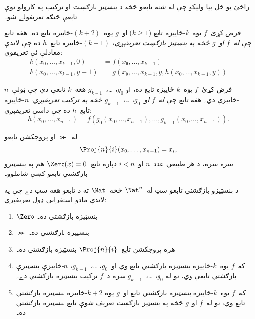 \documentclass[../../../include/open-logic-section]{subfiles}
\begin{document}

راځئ يو ځل بيا وليکو چې له شته تابعو څخه د بنسټيز بازګښت او ترکيب
په کارولو نوې تابعې څنګه تعريفولے شو۔

\begin{defn}
   فرض کړئ~$f$ يوه~$k$-ځاييزه
  تابع ($k\ge 1$) او~$g$ يوه~$(k+2)$-ځاييزه تابع ده۔ هغه تابع چې
  \emph{له~$f$ او~$g$ څخه په بنسټيز بازګښت تعريفېږي}،
  $(k+1)$-ځاييزه تابع~$h$ ده چې لاندې معادلې ئې تعريفوي:
  \begin{align*}
    h(x_0,\dots,x_{k-1},0) & =  f(x_0,\dots,x_{k-1}) \\
    h(x_0,\dots,x_{k-1},y+1) & = g(x_0,\dots,x_{k-1}, y, h(x_0,\dots,x_{k-1}, y))
  \end{align*}
\end{defn}

\begin{defn}
   فرض کړئ~$f$ يوه~$k$-ځاييزه تابع ده، او
  $g_0$، \dots،~$g_{k-1}$ هغه~$k$ تابعې دي چې ټولې~$n$-ځاييزې
  دي۔ هغه تابع چې \emph{له~$f$ او~$g_0$، \dots،~$g_{k-1}$ څخه په
    ترکيب تعريفېږي}، $n$-ځاييزه تابع~$h$ ده چې داسې تعريفېږي:
  \[
  h(x_0, \dots, x_{n-1}) =
  f(g_0(x_0, \dots, x_{n-1}), \dots, g_{k-1}(x_0, \dots, x_{n-1})).
  \]
\end{defn}

له~$\Succ$ او پروجکشن تابعو
\[
\Proj{n}{i}(x_0,\dots,x_{n-1}) = x_i,
\]
سره سره، د هر طبيعي عدد~$n$ او~$i < n$ دپاره تابع~$\Zero(x) = 0$
هم په بنسټيزو بازګشتي تابعو کښې شاملوو۔

\begin{defn}
  د بنسټيزو بازګشتي تابعو سټ له~$\Nat^n$ څخه~$\Nat$ ته د تابعو هغه
  سټ دے چې په لاندې مادو استقرايي ډول تعريفېږي:
  \begin{enumerate}
  \item $\Zero$ بنسټيزه بازګشتي ده۔
  \item $\Succ$ بنسټيزه بازګشتي ده۔
  \item هره پروجکشن تابع~$\Proj{n}{i}$ بنسټيزه بازګشتي ده۔
  \item که~$f$ يوه~$k$-ځاييزه بنسټيزه بازګشتي تابع وي او~$g_0$،
    \dots،~$g_{k-1}$، $n$-ځاييزې بنسټيزې بازګشتي تابعې وي، نو له
    $g_0$، \dots،~$g_{k-1}$ سره د~$f$ ترکيب بنسټيزه بازګشتي دے۔
  \item که~$f$ يوه~$k$-ځاييزه بنسټيزه بازګشتي تابع او~$g$ يوه
    $k+2$-ځاييزه بنسټيزه بازګشتي تابع وي، نو له~$f$ او~$g$ څخه په
    بنسټيز بازګښت تعريف شوې تابع بنسټيزه بازګشتي ده۔
\end{enumerate}
\end{defn}
\end{document}
